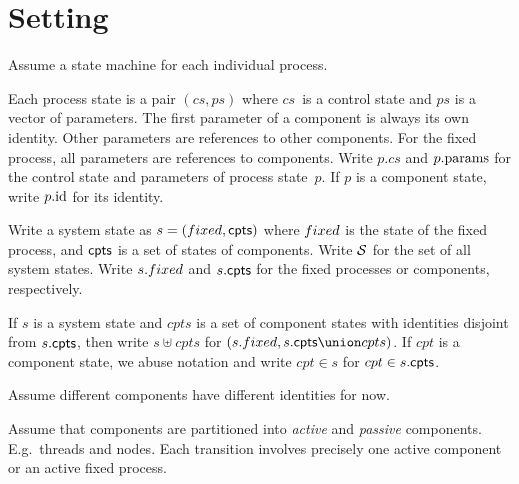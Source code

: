 
\section{Setting}

Assume a state machine for each individual process. 

Each process state is a pair $(cs, ps)$ where $cs$~is a control state and $ps$
is a vector of parameters.  The first parameter of a component is always its
own identity.  Other parameters are references to other components.  For the
fixed process, all parameters are references to components.  Write $p.cs$ and
$p.\params$ for the control state and parameters of process state~$p$.  If $p$
is a component state, write $p.\id$ for its identity.
  

Write a system state as $s = (\fixed, \cpt)$ where $\fixed$ is the state of
the fixed process, and $\cpt$ is a set of states of components.  Write $\S$
for the set of all system states.  Write $s.\fixed$ and $s.\cpt$ for the fixed
processes or components, respectively.

If $s$ is a system state and $cpts$ is a set of component states with identities
disjoint from $s.\cpt$, then write $s \uplus cpts$ for $(s.\fixed, s.\cpt \union
cpts)$.  If $cpt$ is a component state, we abuse notation and write $cpt \in
s$ for $cpt \in s.\cpt$.

Assume different components have different identities for now. 


Assume that components are partitioned into \emph{active} and \emph{passive}
components.  E.g.~threads and nodes.  Each transition involves precisely one
active component or an active fixed process. 


